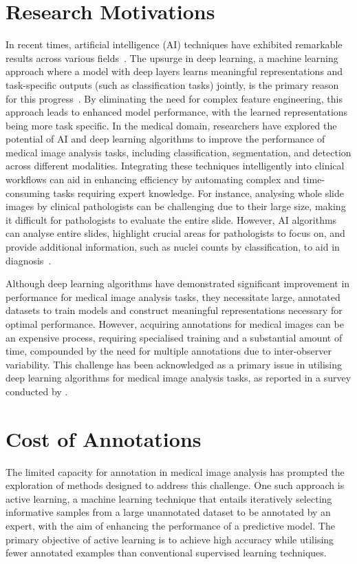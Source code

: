 \section{Research Motivations}
\label{sec:motivation}
In recent times, artificial intelligence (AI) techniques have exhibited remarkable results across various fields~\citep{sarker2021deep}. The upsurge in deep learning, a machine learning approach where a model with deep layers learns meaningful representations and task-specific outputs (such as classification tasks) jointly, is the primary reason for this progress~\citep{lecun2015deep}. By eliminating the need for complex feature engineering, this approach leads to enhanced model performance, with the learned representations being more task specific. In the medical domain, researchers have explored the potential of AI and deep learning algorithms to improve the performance of medical image analysis tasks, including classification, segmentation, and detection across different modalities. Integrating these techniques intelligently into clinical workflows can aid in enhancing efficiency by automating complex and time-consuming tasks requiring expert knowledge. For instance, analysing whole slide images by clinical pathologists can be challenging due to their large size, making it difficult for pathologists to evaluate the entire slide. However, AI algorithms can analyse entire slides, highlight crucial areas for pathologists to focus on, and provide additional information, such as nuclei counts by classification, to aid in diagnosis~\citep{dimitriou2019deep}.

Although deep learning algorithms have demonstrated significant improvement in performance for medical image analysis tasks, they necessitate large, annotated datasets to train models and construct meaningful representations necessary for optimal performance. However, acquiring annotations for medical images can be an expensive process, requiring specialised training and a substantial amount of time, compounded by the need for multiple annotations due to inter-observer variability. This challenge has been acknowledged as a primary issue in utilising deep learning algorithms for medical image analysis tasks, as reported in a survey conducted by \cite{litjens2017survey}.

\section{Cost of Annotations}
The limited capacity for annotation in medical image analysis has prompted the exploration of methods designed to address this challenge. One such approach is active learning, a machine learning technique that entails iteratively selecting informative samples from a large unannotated dataset to be annotated by an expert, with the aim of enhancing the performance of a predictive model. The primary objective of active learning is to achieve high accuracy while utilising fewer annotated examples than conventional supervised learning techniques.

